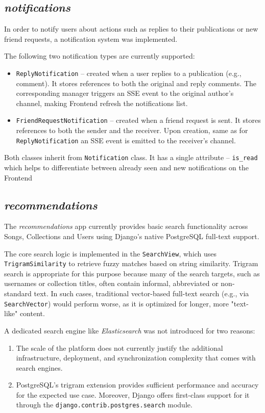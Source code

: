 \subsection{\textit{notifications}}\label{subsec:notif}
In order to notify users about actions such as replies to their publications
or new friend requests, a notification system was implemented.

The following two notification types are currently supported:
\begin{itemize}
    \item \texttt{ReplyNotification} – created when a user replies to a publication (e.g., comment).
    It stores references to both the original and reply comments. The corresponding manager triggers an SSE
    event to the original author's channel, making Frontend refresh the notifications list.
    \item \texttt{FriendRequestNotification} – created when a friend request is sent.
    It stores references to both the sender and the receiver. Upon creation, same as for \texttt{ReplyNotification}
    an SSE event is emitted to the receiver's channel.
\end{itemize}

Both classes inherit from \texttt{Notification} class. It has a single attribute -- \texttt{is\_read} which helps to
differentiate between already seen and new notifications on the Frontend

\subsection{\textit{recommendations}}
The \textit{recommendations} app currently provides basic search functionality across Songs,
Collections and Users using Django’s native PostgreSQL full-text support.

The core search logic is implemented in the \texttt{SearchView},
which uses \texttt{TrigramSimilarity} to retrieve fuzzy matches based on string similarity.
Trigram search is appropriate for this purpose because many
of the search targets, such as usernames or collection titles, often contain informal,
abbreviated or non-standard text.
In such cases, traditional vector-based full-text search
(e.g., via \texttt{SearchVector}) would perform worse, as it is optimized for longer,
more "text-like" content.

A dedicated search engine like \textit{Elasticsearch} was not introduced for two reasons:
\begin{enumerate}
    \item The scale of the platform does not currently justify the additional
    infrastructure, deployment, and synchronization complexity that comes
    with search engines.
    \item PostgreSQL's trigram extension provides sufficient performance
    and accuracy for the expected use case.
    Moreover, Django offers first-class support for it
    through the \texttt{django.contrib.postgres.search} module.
\end{enumerate}

